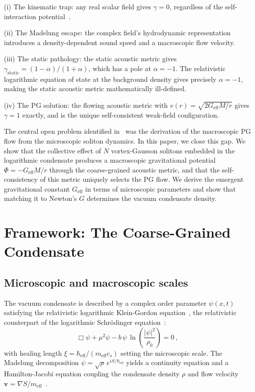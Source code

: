 \documentclass[12pt, a4paper]{article}
\newcommand{\Geff}{G_{\mathrm{eff}}}
\newcommand{\cs}{c_s}
\newcommand{\meff}{m_{\mathrm{eff}}}
\newcommand{\heff}{\hbar_{\mathrm{eff}}}
\begin{document}
(i) The kinematic trap: any real scalar field gives $\gamma = 0$, regardless of the self-interaction potential~\cite{will_2014}.

(ii) The Madelung escape: the complex field's hydrodynamic representation introduces a density-dependent sound speed and a macroscopic flow velocity.

(iii) The static pathology: the static acoustic metric gives $\gamma_{\mathrm{static}} = (1-\alpha)/(1+\alpha)$, which has a pole at $\alpha = -1$. The relativistic logarithmic equation of state at the background density gives precisely $\alpha = -1$, making the static acoustic metric mathematically ill-defined.

(iv) The PG solution: the flowing acoustic metric with $v(r) = \sqrt{2\Geff M/r}$ gives $\gamma = 1$ exactly, and is the unique self-consistent weak-field configuration.

The central open problem identified in~\cite{kulangiev_2026} was the derivation of the macroscopic PG flow from the microscopic soliton dynamics. In this paper, we close this gap. We show that the collective effect of $N$ vortex-Gausson solitons embedded in the logarithmic condensate produces a macroscopic gravitational potential $\Phi = -\Geff M/r$ through the coarse-grained acoustic metric, and that the self-consistency of this metric uniquely selects the PG flow. We derive the emergent gravitational constant $\Geff$ in terms of microscopic parameters and show that matching it to Newton's $G$ determines the vacuum condensate density.


\section{Framework: The Coarse-Grained Condensate}
\label{sec:framework}

\subsection{Microscopic and macroscopic scales}

The vacuum condensate is described by a complex order parameter $\psi(x,t)$ satisfying the relativistic logarithmic Klein-Gordon equation~\cite{rosen_1969,bartkowski_gorka_2008}, the relativistic counterpart of the logarithmic Schr\"{o}dinger equation~\cite{bialynicki_birula_1979}:
\begin{equation}
    \Box\psi + \mu^2\psi - b\,\psi\,\ln\!\left(\frac{|\psi|^2}{\rho_0}\right) = 0\,,
\label{eq:log_kg}
\end{equation}
with healing length $\xi = \heff/(\meff \cs)$ setting the microscopic scale. The Madelung decomposition $\psi = \sqrt{\rho}\,e^{iS/\heff}$ yields a continuity equation and a Hamilton-Jacobi equation coupling the condensate density $\rho$ and flow velocity $\mathbf{v} = \nabla S/\meff$~\cite{kulangiev_2026}.
\end{document}
